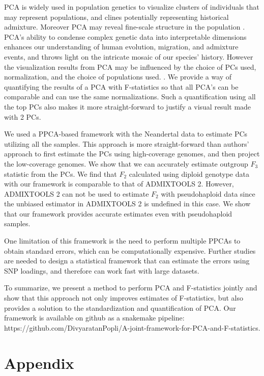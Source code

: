\documentclass[12pt, letterpaper]{article}
\begin{document}
PCA is widely used in population genetics to visualize clusters of individuals that may represent populations, and clines potentially representing historical admixture. Moreover PCA may reveal fine-scale structure in the population \cite{waldman_genome-wide_2022}. PCA's ability to condense complex genetic data into interpretable dimensions enhances our understanding of human evolution, migration, and admixture events, and throws light on the intricate mosaic of our species' history. However the visualization results from PCA may be influenced by the choice of PCs used, normalization, and the choice of populations used. \cite{elhaik_principal_2022}. We provide a way of quantifying the results of a PCA with F-statistics so that all PCA's can be comparable and can use the same normalizations. Such a quantification using all the top PCs also makes it more straight-forward to justify a visual result made with 2 PCs.

We used a PPCA-based framework with the Neandertal data to estimate PCs utilizing all the samples. This approach is more straight-forward than authors' approach to first estimate the PCs using high-coverage genomes, and then project the low-coverage genomes. We show that we can accurately estimate outgroup $F_3$ statistic from the PCs. We find that $F_2$ calculated using diploid genotype data with our framework is comparable to that of ADMIXTOOLS 2. However, ADMIXTOOLS 2 can not be used to estimate $F_2$ with pseudohaploid data since the unbiased estimator in ADMIXTOOLS 2 is undefined in this case. We show that our framework provides accurate estimates even with pseudohaploid samples. 

One limitation of this framework is the need to perform multiple PPCAs to obtain standard errors, which can be computationally expensive. Further studies are needed to design a statistical framework that can estimate the errors using SNP loadings, and therefore can work fast with large datasets.

To summarize, we present a method to perform PCA and F-statistics jointly and show that this approach not only improves estimates of F-statistics, but also provides a solution to the standardization and quantification of PCA. Our framework is available on github as a snakemake pipeline: https://github.com/DivyaratanPopli/A-joint-framework-for-PCA-and-F-statistics.





\section{Appendix}
\end{document}
